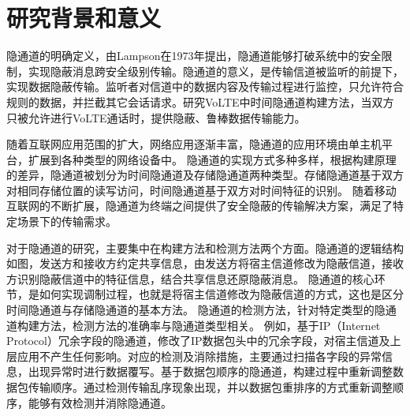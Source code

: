 \section{研究背景和意义}
\label{sec:intro:backgroud}



隐通道的明确定义，由Lampson在1973年提出，隐通道能够打破系统中的安全限制，实现隐蔽消息跨安全级别传输。隐通道的意义，是传输信道被监听的前提下，实现数据隐蔽传输。监听者对信道中的数据内容及传输过程进行监控，只允许符合规则的数据，并拦截其它会话请求。研究VoLTE中时间隐通道构建方法，当双方只被允许进行VoLTE通话时，提供隐蔽、鲁棒数据传输能力。

随着互联网应用范围的扩大，网络应用逐渐丰富，隐通道的应用环境由单主机平台，扩展到各种类型的网络设备中。
隐通道的实现方式多种多样，根据构建原理的差异，隐通道被划分为时间隐通道及存储隐通道两种类型。存储隐通道基于双方对相同存储位置的读写访问，时间隐通道基于双方对时间特征的识别。
随着移动互联网的不断扩展，隐通道为终端之间提供了安全隐蔽的传输解决方案，满足了特定场景下的传输需求。


对于隐通道的研究，主要集中在构建方法和检测方法两个方面。隐通道的逻辑结构如图，发送方和接收方约定共享信息，由发送方将宿主信道修改为隐蔽信道，接收方识别隐蔽信道中的特征信息，结合共享信息还原隐蔽消息。
隐通道的核心环节，是如何实现调制过程，也就是将宿主信道修改为隐蔽信道的方式，这也是区分时间隐通道与存储隐通道的基本方法。
隐通道的检测方法，针对特定类型的隐通道构建方法，检测方法的准确率与隐通道类型相关。
例如，基于IP（Internet Protocol）冗余字段的隐通道，修改了IP数据包头中的冗余字段，对宿主信道及上层应用不产生任何影响。对应的检测及消除措施，主要通过扫描各字段的异常信息，出现异常时进行数据覆写。基于数据包顺序的隐通道，构建过程中重新调整数据包传输顺序。通过检测传输乱序现象出现，并以数据包重排序的方式重新调整顺序，能够有效检测并消除隐通道。

